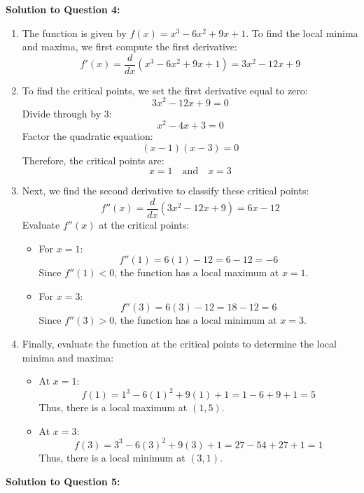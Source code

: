 \documentclass{article}
\begin{document}
   \item \textbf{Solution to Question 4:}
    \begin{enumerate}[label=(\alph*), itemsep=10pt]
    \item The function is given by \( f(x) = x^3 - 6x^2 + 9x + 1 \). To find the local minima and maxima, we first compute the first derivative:
    \[
    f'(x) = \frac{d}{dx}(x^3 - 6x^2 + 9x + 1) = 3x^2 - 12x + 9
    \]
    
    \item To find the critical points, we set the first derivative equal to zero:
    \[
    3x^2 - 12x + 9 = 0
    \]
    Divide through by 3:
    \[
    x^2 - 4x + 3 = 0
    \]
    Factor the quadratic equation:
    \[
    (x - 1)(x - 3) = 0
    \]
    Therefore, the critical points are:
    \[
    x = 1 \quad \text{and} \quad x = 3
    \]

    \item Next, we find the second derivative to classify these critical points:
    \[
    f''(x) = \frac{d}{dx}(3x^2 - 12x + 9) = 6x - 12
    \]
    Evaluate \( f''(x) \) at the critical points:
    \begin{itemize}
        \item For \( x = 1 \):
        \[
        f''(1) = 6(1) - 12 = 6 - 12 = -6
        \]
        Since \( f''(1) < 0 \), the function has a local maximum at \( x = 1 \).

        \item For \( x = 3 \):
        \[
        f''(3) = 6(3) - 12 = 18 - 12 = 6
        \]
        Since \( f''(3) > 0 \), the function has a local minimum at \( x = 3 \).
    \end{itemize}

    \item Finally, evaluate the function at the critical points to determine the local minima and maxima:
    \begin{itemize}
        \item At \( x = 1 \):
        \[
        f(1) = 1^3 - 6(1)^2 + 9(1) + 1 = 1 - 6 + 9 + 1 = 5
        \]
        Thus, there is a local maximum at \( (1, 5) \).

        \item At \( x = 3 \):
        \[
        f(3) = 3^3 - 6(3)^2 + 9(3) + 1 = 27 - 54 + 27 + 1 = 1
        \]
        Thus, there is a local minimum at \( (3, 1) \).
    \end{itemize}
\end{enumerate}
    \item \textbf{Solution to Question 5:}
\end{document}

